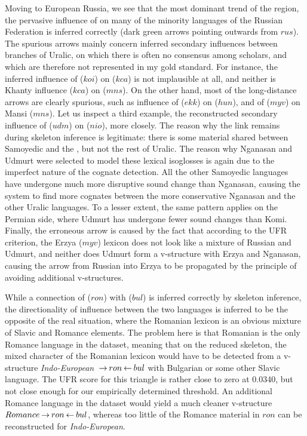  Moving to European Russia, we see that the most dominant trend of the region, the pervasive influence of  on many of the minority languages of the Russian Federation is inferred correctly (dark green arrows pointing outwards from $rus$). The spurious arrows mainly concern inferred secondary influences between branches of Uralic, on which there is often no consensus among scholars, and which are therefore not represented in my gold standard. For instance, the inferred influence of  ($koi$) on  ($kca$) is not implausible at all, and neither is Khanty influence ($kca$) on  ($mns$). On the other hand, most of the long-distance arrows are clearly spurious, such as influence of  ($ekk$) on  ($hun$), and of  ($myv$) on Mansi ($mns$). Let us inspect a third example, the reconstructed secondary influence of  ($udm$) on  ($nio$), more closely. The reason why the link remains during skeleton inference is legitimate: there is some material shared between Samoyedic and the , but not the rest of Uralic. The reason why Nganasan and Udmurt were selected to model these lexical isoglosses is again due to the imperfect nature of the cognate detection. All the other Samoyedic languages have undergone much more disruptive sound change than Nganasan, causing the system to find more cognates between the more conservative Nganasan and the other Uralic languages. To a lesser extent, the same pattern applies on the Permian side, where Udmurt has undergone fewer sound changes than Komi. Finally, the erroneous arrow is caused by the fact that according to the UFR criterion, the Erzya ($myv$) lexicon does not look like a mixture of Russian and Udmurt, and neither does Udmurt form a v-structure with Erzya and Nganasan, causing the arrow from Russian into Erzya to be propagated by the principle of avoiding additional v-structures.
 
 While a connection of  ($ron$) with  ($bul$) is inferred correctly by skeleton inference, the directionality of influence between the two languages is inferred to be the opposite of the real situation, where the Romanian lexicon is an obvious mixture of Slavic and Romance elements. The problem here is that Romanian is the only Romance language in the dataset, meaning that on the reduced skeleton, the mixed character of the Romanian lexicon would have to be detected from a v-structure \textit{Indo-European} $\kern 2pt\hbox{$\rightarrow$}\kern 2pt ron \kern 2pt\hbox{$\leftarrow$}\kern 2pt bul$ with Bulgarian or some other Slavic language. The UFR score for this triangle is rather close to zero at 0.0340, but not close enough for our empirically determined threshold. An additional Romance language in the dataset would yield a much cleaner v-structure $Romance \kern 2pt\hbox{$\rightarrow$}\kern 2pt ron \kern 2pt\hbox{$\leftarrow$}\kern 2pt bul$, whereas too little of the Romance material in $ron$ can be reconstructed for \textit{Indo-European}.
 
